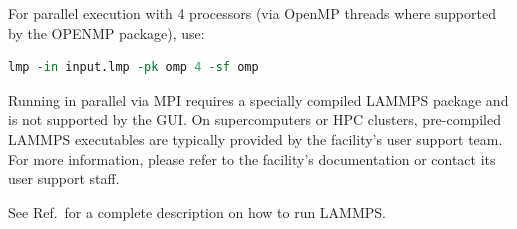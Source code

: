 \documentclass[9pt,tutorial]{livecoms}
\begin{document}
\begin{appendices}
For parallel execution with 4 processors (via OpenMP threads where supported
by the OPENMP package), use:
\begin{lstlisting}[language=tcl]
lmp -in input.lmp -pk omp 4 -sf omp
\end{lstlisting}

\begin{note}
  Running in parallel via MPI requires a specially compiled LAMMPS
  package and is not supported by the GUI.  On supercomputers or HPC
  clusters, pre-compiled LAMMPS executables are typically provided
  by the facility's user support team.  For more information, please
  refer to the facility's documentation or contact its user support staff.
\end{note}

See Ref.\, for a complete description on how to
run LAMMPS.

\end{appendices}
\end{document}
